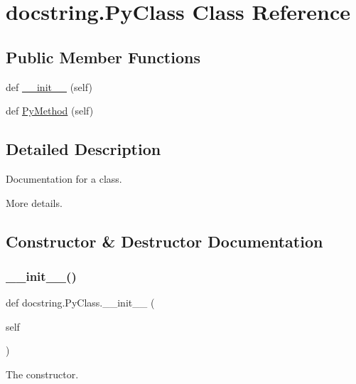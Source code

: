 \hypertarget{classdocstring_1_1_py_class}{}\section{docstring.\+Py\+Class Class Reference}
\label{classdocstring_1_1_py_class}
\subsection*{Public Member Functions}
\begin{DoxyCompactItemize}
\item 
def \mbox{\hyperlink{classdocstring_1_1_py_class_a00dd800dc15e2b727e2a37c6f6c40e8b}{\+\_\+\+\_\+init\+\_\+\+\_\+}} (self)
\item 
def \mbox{\hyperlink{classdocstring_1_1_py_class_af092e1eacc10334e0e8630531a3473b4}{Py\+Method}} (self)
\end{DoxyCompactItemize}


\subsection{Detailed Description}
\begin{DoxyVerb}Documentation for a class.

More details.
\end{DoxyVerb}
 

\subsection{Constructor \& Destructor Documentation}
\mbox{\label{classdocstring_1_1_py_class_a00dd800dc15e2b727e2a37c6f6c40e8b}} 
\subsubsection{\texorpdfstring{\_\_init\_\_()}{\_\_init\_\_()}}
{\footnotesize\ttfamily def docstring.\+Py\+Class.\+\_\+\+\_\+init\+\_\+\+\_\+ (\begin{DoxyParamCaption}\item[{}]{self }\end{DoxyParamCaption})}

\begin{DoxyVerb}The constructor.\end{DoxyVerb}
 

